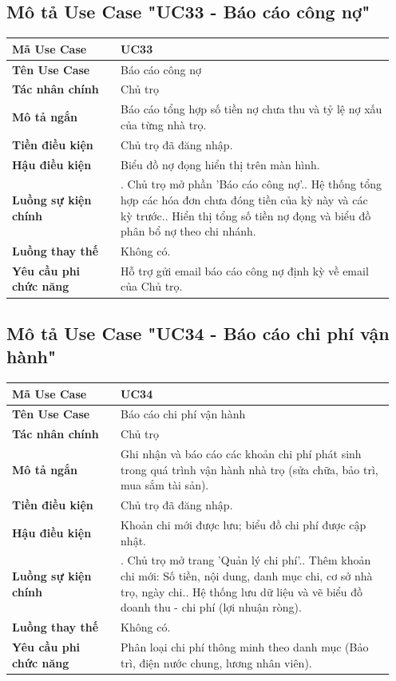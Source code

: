 \subsection{Mô tả Use Case "UC33 - Báo cáo công nợ"}

\begin{longtable}[]{@{}>{\RaggedRight\arraybackslash}p{0.27\linewidth}>{\RaggedRight\arraybackslash}p{0.68\linewidth}@{}}
\toprule
\textbf{Mã Use Case} & UC33\tabularnewline
\midrule
\endhead
\textbf{Tên Use Case} & Báo cáo công nợ\tabularnewline
\textbf{Tác nhân chính} & Chủ trọ\tabularnewline
\textbf{Mô tả ngắn} & Báo cáo tổng hợp số tiền nợ chưa thu và tỷ lệ nợ
xấu của từng nhà trọ.\tabularnewline
\textbf{Tiền điều kiện} & Chủ trọ đã đăng nhập.\tabularnewline
\textbf{Hậu điều kiện} & Biểu đồ nợ đọng hiển thị trên màn
hình.\tabularnewline
\textbf{Luồng sự kiện chính} & 1. Chủ trọ mở phần
'Báo cáo công nợ'.\newline 2. Hệ thống tổng hợp các hóa đơn chưa
đóng tiền của kỳ này và các kỳ trước.\newline 3. Hiển thị tổng số
tiền nợ đọng và biểu đồ phân bổ nợ theo chi nhánh.\tabularnewline
\textbf{Luồng thay thế} & Không có.\tabularnewline
\textbf{Yêu cầu phi chức năng} & Hỗ trợ gửi email báo cáo công nợ định
kỳ về email của Chủ trọ.\tabularnewline
\bottomrule
\end{longtable}

\subsection{Mô tả Use Case "UC34 - Báo cáo chi phí vận hành"}

\begin{longtable}[]{@{}>{\RaggedRight\arraybackslash}p{0.27\linewidth}>{\RaggedRight\arraybackslash}p{0.68\linewidth}@{}}
\toprule
\textbf{Mã Use Case} & UC34\tabularnewline
\midrule
\endhead
\textbf{Tên Use Case} & Báo cáo chi phí vận hành\tabularnewline
\textbf{Tác nhân chính} & Chủ trọ\tabularnewline
\textbf{Mô tả ngắn} & Ghi nhận và báo cáo các khoản chi phí phát sinh
trong quá trình vận hành nhà trọ (sửa chữa, bảo trì, mua sắm tài
sản).\tabularnewline
\textbf{Tiền điều kiện} & Chủ trọ đã đăng nhập.\tabularnewline
\textbf{Hậu điều kiện} & Khoản chi mới được lưu; biểu đồ chi phí được
cập nhật.\tabularnewline
\textbf{Luồng sự kiện chính} & 1. Chủ trọ mở trang
'Quản lý chi phí'.\newline 2. Thêm khoản chi mới: Số tiền, nội
dung, danh mục chi, cơ sở nhà trọ, ngày chi.\newline 3. Hệ thống
lưu dữ liệu và vẽ biểu đồ doanh thu - chi phí (lợi nhuận
ròng).\tabularnewline
\textbf{Luồng thay thế} & Không có.\tabularnewline
\textbf{Yêu cầu phi chức năng} & Phân loại chi phí thông minh theo danh
mục (Bảo trì, điện nước chung, lương nhân viên).\tabularnewline
\bottomrule
\end{longtable}


